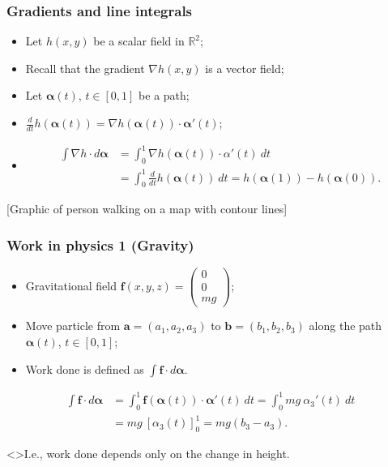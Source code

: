 \documentclass[aspectratio=169,handout]{beamer}
\newcommand{\bR}{\mathbb{R}} %
\renewcommand{\aa}{\mathbf{a}}
\newcommand{\bb}{\mathbf{b}}
\newcommand{\ff}{\mathbf{f}}
\newcommand{\aalpha}{\boldsymbol{\alpha}}
\begin{document}
\begin{frame}
    \frametitle{Gradients and line integrals}

    \begin{itemize}
        \item Let \(h(x,y)\) be a scalar field in \(\bR^2\);
        \item Recall that the gradient \(\nabla h(x,y)\) is a vector field;
        \item Let \(\aalpha(t)\), \(t\in [0,1]\) be a path;
        \item \(\frac{d}{dt} h(\aalpha(t)) = \nabla h(\aalpha(t))\cdot \aalpha'(t)\);
        \item \[
                  \begin{aligned}
                      \int \nabla h \cdot d\aalpha
                       & = \int_0^1 \nabla h(\aalpha(t)) \cdot \alpha'(t)\ dt \\
                       & = \int_0^1 \tfrac{d}{dt} h(\aalpha(t)) \ dt
                      = h(\aalpha(1)) - h(\aalpha(0)).
                  \end{aligned}
              \]
    \end{itemize}




    [Graphic of person walking on a map with contour lines]


\end{frame}

\begin{frame}
    \frametitle{Work in physics 1 (Gravity)}


    \begin{itemize}
        \item Gravitational field \(\ff(x,y,z) = \left(\begin{smallmatrix}
                  0 \\ 0 \\ mg
              \end{smallmatrix}\right)\);
        \item Move particle from \(\aa=(a_1,a_2,a_3)\) to \(\bb=(b_1,b_2,b_3)\) along the path \(\aalpha(t)\), \(t\in [0,1]\);
        \item Work done is defined as \(\int \ff \cdot d\aalpha\).
    \end{itemize}

    \[
        \begin{aligned}
            \int \ff \cdot d\aalpha & = \int_0^1 \ff(\aalpha(t)) \cdot \aalpha'(t) \ dt
            = \int_0^1 mg \ \alpha_3'(t) \ dt                                               \\
                                    & = mg \ \left[ \alpha_3(t)\right]_0^1 = mg(b_3 - a_3).
        \end{aligned}
    \]

    \structure<>{I.e.,} work done depends only on the change in height.
\end{frame}
\end{document}
